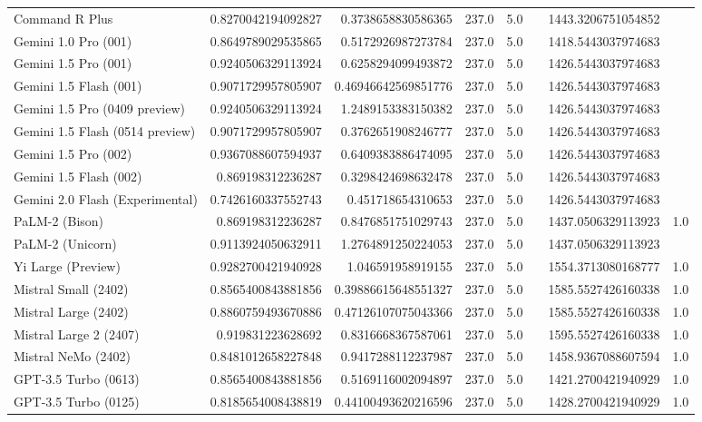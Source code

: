 \begin{table}[htp]
{\begin{tabular}{lrrrrrrr}
Command R Plus & 0.8270042194092827 & 0.3738658830586365 & 237.0 & 5.0 &  & 1443.3206751054852 &  \\
Gemini 1.0 Pro (001) & 0.8649789029535865 & 0.5172926987273784 & 237.0 & 5.0 &  & 1418.5443037974683 &  \\
Gemini 1.5 Pro (001) & 0.9240506329113924 & 0.6258294099493872 & 237.0 & 5.0 &  & 1426.5443037974683 &  \\
Gemini 1.5 Flash (001) & 0.9071729957805907 & 0.46946642569851776 & 237.0 & 5.0 &  & 1426.5443037974683 &  \\
Gemini 1.5 Pro (0409 preview) & 0.9240506329113924 & 1.2489153383150382 & 237.0 & 5.0 &  & 1426.5443037974683 &  \\
Gemini 1.5 Flash (0514 preview) & 0.9071729957805907 & 0.3762651908246777 & 237.0 & 5.0 &  & 1426.5443037974683 &  \\
Gemini 1.5 Pro (002) & 0.9367088607594937 & 0.6409383886474095 & 237.0 & 5.0 &  & 1426.5443037974683 &  \\
Gemini 1.5 Flash (002) & 0.869198312236287 & 0.3298424698632478 & 237.0 & 5.0 &  & 1426.5443037974683 &  \\
Gemini 2.0 Flash (Experimental) & 0.7426160337552743 & 0.451718654310653 & 237.0 & 5.0 &  & 1426.5443037974683 &  \\
PaLM-2 (Bison) & 0.869198312236287 & 0.8476851751029743 & 237.0 & 5.0 &  & 1437.0506329113923 & 1.0 \\
PaLM-2 (Unicorn) & 0.9113924050632911 & 1.2764891250224053 & 237.0 & 5.0 &  & 1437.0506329113923 &  \\
Yi Large (Preview) & 0.9282700421940928 & 1.046591958919155 & 237.0 & 5.0 &  & 1554.3713080168777 & 1.0 \\
Mistral Small (2402) & 0.8565400843881856 & 0.39886615648551327 & 237.0 & 5.0 &  & 1585.5527426160338 & 1.0 \\
Mistral Large (2402) & 0.8860759493670886 & 0.47126107075043366 & 237.0 & 5.0 &  & 1585.5527426160338 & 1.0 \\
Mistral Large 2 (2407) & 0.919831223628692 & 0.8316668367587061 & 237.0 & 5.0 &  & 1595.5527426160338 & 1.0 \\
Mistral NeMo (2402) & 0.8481012658227848 & 0.9417288112237987 & 237.0 & 5.0 &  & 1458.9367088607594 & 1.0 \\
GPT-3.5 Turbo (0613) & 0.8565400843881856 & 0.5169116002094897 & 237.0 & 5.0 &  & 1421.2700421940929 & 1.0 \\
GPT-3.5 Turbo (0125) & 0.8185654008438819 & 0.44100493620216596 & 237.0 & 5.0 &  & 1428.2700421940929 & 1.0 \\

\end{tabular}}
\end{table}
